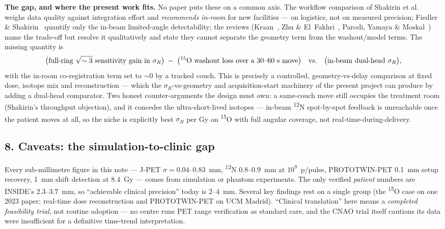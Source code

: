 \documentclass[11pt]{article}
\newcommand{\iso}[2]{\textsuperscript{#1}#2}
\begin{document}
\medskip
\noindent\textbf{The gap, and where the present work fits.} No paper puts these on
a common axis. The workflow comparison of Shakirin et al.~\cite{shakirin2011}
weighs data quality against integration effort and \emph{recommends in-room} for
new facilities --- on logistics, not on measured precision; Fiedler \&
Shakirin~\cite{fiedler2010} quantify only the in-beam limited-angle detectability;
the reviews (Kraan~\cite{kraan2015}, Zhu \& El~Fakhri~\cite{zhuelfakhri2013},
Parodi, Yamaya \& Moskal~\cite{parodiyamaya2023}) name the trade-off but resolve
it qualitatively and state they cannot separate the geometry term from the
washout/model terms. The missing quantity is
%
\[
  \big(\text{full-ring }\sqrt{\sim3}\text{ sensitivity gain in }\sigma_R\big)
  \;-\;\big(\text{\iso{15}{O} washout loss over a }30\text{--}60~\text{s move}\big)
  \quad\text{vs.}\quad
  \big(\text{in-beam dual-head }\sigma_R\big),
\]
%
with the in-room co-registration term set to $\sim$0 by a tracked couch. This is
precisely a controlled, geometry-vs-delay comparison at fixed dose, isotope mix
and reconstruction --- which the $\sigma_R$-vs-geometry and acquisition-start
machinery of the present project can produce by adding a dual-head comparator. Two
honest counter-arguments the design must own: a same-couch move still occupies the
treatment room (Shakirin's throughput objection), and it concedes the
ultra-short-lived isotopes --- in-beam \iso{12}{N} spot-by-spot feedback is
unreachable once the patient moves at all, so the niche is explicitly best
$\sigma_R$ per Gy on \iso{15}{O} with full angular coverage, not real-time-during-delivery.

\subsection*{8. Caveats: the simulation-to-clinic gap}

Every sub-millimetre figure in this note --- J-PET $\sigma = 0.04$--$0.83$~mm,
\iso{12}{N} $0.8$--$0.9$~mm at $10^{9}$~p/pulse, PROTOTWIN-PET 0.1~mm setup
recovery, 1~mm shift detection at 8.4~Gy --- comes from simulation or phantom
experiments. The only verified \emph{patient} numbers are INSIDE's
$2.3$--$3.7$~mm, so ``achievable clinical precision'' today is $2$--$4$~mm.
Several key findings rest on a single group (the \iso{15}{O} case on one 2023
paper; real-time dose reconstruction and PROTOTWIN-PET on UCM Madrid).
``Clinical translation'' here means a \emph{completed feasibility trial}, not
routine adoption --- no centre runs PET range verification as standard care, and
the CNAO trial itself cautions its data were insufficient for a definitive
time-trend interpretation.
\end{document}
